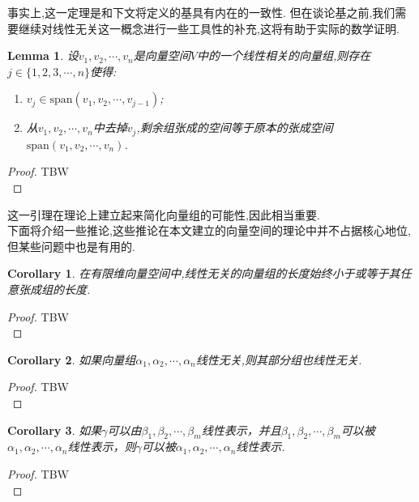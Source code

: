 \documentclass{ctexart}
\newtheorem{corollary}{Corollary}
\newtheorem{lemma}{Lemma}
\begin{document}
\noindent 事实上,这一定理是和下文将定义的基具有内在的一致性. 但在谈论基之前,我们需要继续对线性无关这一概念进行一些工具性的补充,这将有助于实际的数学证明.

\begin{lemma}
    设$v_1,v_2,\cdots,v_n$是向量空间$V$中的一个线性相关的向量组,则存在$j\in \{1,2,3,\cdots,n\}$使得:
    \begin{enumerate}
        \item $v_j\in \mbox{span}(v_1,v_2,\cdots,v_{j-1})$;
        \item 从$v_1,v_2,\cdots,v_n$中去掉$v_j$,剩余组张成的空间等于原本的张成空间$\mbox{span}(v_1,v_2,\cdots,v_n)$.
    \end{enumerate}
\end{lemma}
\begin{proof}
    TBW\\
\end{proof}

\noindent 这一引理在理论上建立起来简化向量组的可能性,因此相当重要.\\

\noindent 下面将介绍一些推论,这些推论在本文建立的向量空间的理论中并不占据核心地位,但某些问题中也是有用的.

\begin{corollary}
    在有限维向量空间中,线性无关的向量组的长度始终小于或等于其任意张成组的长度.
\end{corollary}

\begin{proof}
    TBW\\
\end{proof}


\begin{corollary}
    如果向量组$\alpha_1,\alpha_2,\cdots,\alpha_n$线性无关,则其部分组也线性无关.
\end{corollary}
\begin{proof}
    TBW\\
\end{proof}


\begin{corollary}
    如果$\gamma$可以由$\beta_1,\beta_2,\cdots,\beta_m$线性表示，并且$\beta_1,\beta_2,\cdots,\beta_m$可以被$\alpha_1,\alpha_2,\cdots,\alpha_n$线性表示，则$\gamma$可以被$\alpha_1,\alpha_2,\cdots,\alpha_n$线性表示.
\end{corollary}
\begin{proof}
    TBW\\
\end{proof}
\end{document}
